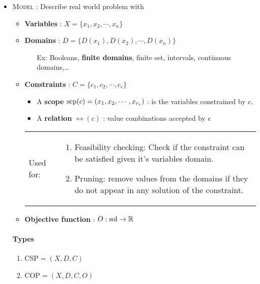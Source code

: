 
\begin{itemize}
    \item \textsc{Model} : Describe real world problem with
        \begin{itemize}
            \item \textbf{Variables} : $X = \{x_1, x_2,\cdots, x_n\}$

            \item \textbf{Domains} : $D = \{ D(x_1), D(x_2),\cdots,
                D(x_n)\}$

                \begin{itemize}
                    \item[Ex:] Booleans, \textbf{finite domains}, finite
                        set, intervals, continuous domains,\ldots
                \end{itemize}
            \item \textbf{Constraints} : $C = \{c_1, c_2,\cdots, c_e\}$
                \begin{itemize}
                    \item A \textbf{scope} $\operatorname{scp}(c) = (x_1, x_2,\cdots,x_{r_e})$ : is the
                        variables constrained by c.
                    \item A \textbf{relation} $\rel(c)$ : value combinations accepted by
                        c
                \end{itemize}

                \begin{tabular}{m{1.5cm}m{12cm}}
                    Used for:&
                \begin{enumerate}
                    \item Feasibility checking: Check if the constraint can be satisfied
                        given it's variables domain. 

                    \item Pruning: remove values from the domains if they do not appear
                        in any solution of the constraint.
                \end{enumerate}
                \end{tabular}

            \item \textbf{Objective function} : $O : \operatorname{sol} \to \mathbb{R}$
        \end{itemize}

        \paragraph{Types}
        \begin{enumerate}
            \item CSP${} = (X, D, C)$
            \item COP${} = (X, D, C, O)$
        \end{enumerate}


\end{itemize}

